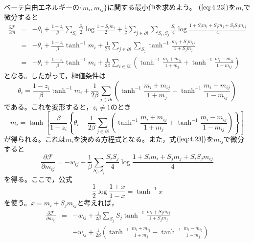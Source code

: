 ベーテ自由エネルギーの$\{m_{i},m_{ij}\}$に関する最小値を求めよう。
$(\ref{eq:4.23})$を$m_{i}$で微分すると
\begin{eqnarray}
\frac{\partial\mathcal{F}}{\partial m}&=&-\theta_{i}+
\frac{1-z_{i}}{\beta}\sum_{S_{i}}\frac{S_{i}}{2}\log\frac{1+S_{i}m_{i}}{2}
+\frac{1}{\beta}\sum_{j\in\partial i}\sum_{S_{i},S_{j}}\frac{S_{i}}{4}
\log\frac{1+S_{i}m_{i}+S_{j}m_{j}+S_{i}S_{j}m_{ij}}{4}\nonumber\\
&=&-\theta_{i}+\frac{1-z_{i}}{\beta}\tanh^{-1}m_{i}+\frac{1}{2\beta}
\sum_{j\in\partial
i}\sum_{S_{j}}\tanh^{-1}\frac{m_{i}+S_{j}m_{ij}}{1+S_{j}m_{j}}\nonumber\\
&=&-\theta_{i}+\frac{1-z_{i}}{\beta}\tanh^{-1}m_{i}
+\frac{1}{2\beta}\sum_{i\in\partial i}\left(
\tanh^{-1}\frac{m_{i}+m_{ij}}{1+m_{j}}+\tanh^{-1}\frac{m_{i}-m_{ij}}{1-m_{ij}}
\right)\label{eq:4.24}
\end{eqnarray}
となる。したがって，極値条件は
\begin{equation}
\theta_{i}=\frac{1-z_{i}}{\beta}\tanh^{-1}m_{i}+\frac{1}{2\beta}
\sum_{j\in\partial i}\left(
\tanh^{-1}\frac{m_{i}+m_{ij}}{1+m_{j}}+\tanh^{-1}\frac{m_{i}-m_{ij}}{1-m_{ij}}
\right)\label{eq:4.25}
\end{equation}
である。これを変形すると，$z_{i}\neq 1$のとき
\begin{equation}
m_{i}=\tanh\left[\frac{\beta}{1-z_{i}}\left\{\theta_{i}-
\frac{1}{2\beta}\sum_{j\in\partial i}
\left(
\tanh^{-1}\frac{m_{i}+m_{ij}}{1+m_{j}}+\tanh^{-1}\frac{m_{i}-m_{ij}}{1-m_{ij}}
\right)\right\}\right]
\end{equation}
が得られる。これは$m_{i}$を決める方程式となる。また，式$(\ref{eq:4.23})$を$m_{ij}$で微分
すると
\begin{equation}
\frac{\partial\mathcal{F}}{\partial m_{ij}}=
-w_{ij}+\frac{1}{\beta}\sum_{S_{i},S_{j}}\frac{S_{i}S_{j}}{4}
\log\frac{1+S_{i}m_{i}+S_{j}m_{j}+S_{i}S_{j}m_{ij}}{4}\nonumber
\end{equation}
を得る。ここで，公式
\begin{equation}
\frac{1}{2}\log\frac{1+x}{1-x}=\tanh^{-1}x\label{eq:atanh}
\end{equation}
を使う。$x=m_{i}+S_{j}m_{ij}$と考えれば，
\begin{eqnarray}
\frac{\partial\mathcal{F}}{\partial m_{ij}}&=&-w_{ij}+\frac{1}{2\beta}
\sum_{S_{j}}S_{j}\tanh^{-1}\frac{m_{i}+S_{j}m_{ij}}{1+S_{j}m_{j}}\nonumber\\
&=&-w_{ij}+\frac{1}{2\beta}\left(
\tanh^{-1}\frac{m_{i}+m_{ij}}{1+m_{j}}-\tanh^{-1}\frac{m_{i}-m_{ij}}{1-m_{j}}
\right)\label{eq:4.27}
\end{eqnarray}
